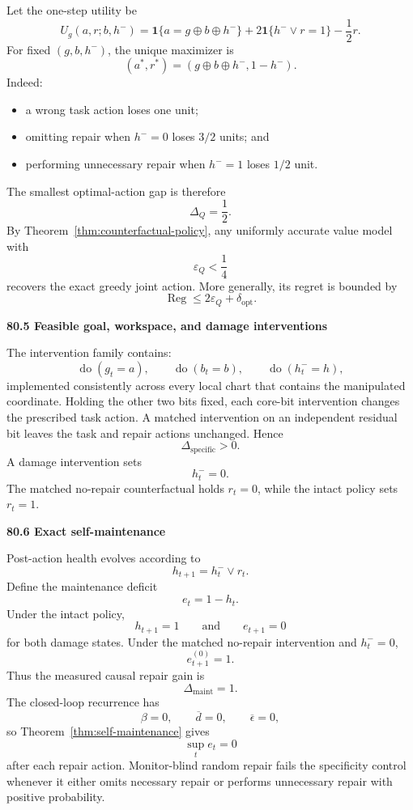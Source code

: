 \documentclass[11pt,letterpaper]{article}
\newcommand{\subtopic}[1]{%
 \vspace{0.45em}
 {\bfseries\color{AccentColor} #1\par}
}
\theoremstyle{plain}
\theoremstyle{definition}
\begin{document}
Let the one-step utility be
\[
U_g(a,r;b,h^-)
=
\mathbf 1\{a=g\oplus b\oplus h^-\}
+2\mathbf 1\{h^-\lor r=1\}
-\frac12r.
\]
For fixed \((g,b,h^-)\), the unique maximizer is
\[
\boxed{
(a^*,r^*)
=
(g\oplus b\oplus h^-,1-h^-).
}
\]
Indeed:
\begin{itemize}
\item a wrong task action loses one unit;
\item omitting repair when \(h^-=0\) loses \(3/2\) units; and
\item performing unnecessary repair when \(h^-=1\) loses \(1/2\) unit.
\end{itemize}
The smallest optimal-action gap is therefore
\[
\Delta_Q=\frac12.
\]
By Theorem~\ref{thm:counterfactual-policy}, any uniformly accurate value model with
\[
\varepsilon_Q<\frac14
\]
recovers the exact greedy joint action. More generally, its regret is bounded
by
\[
\operatorname{Reg}\leq2\varepsilon_Q+\delta_{\mathrm{opt}}.
\]

\subtopic{80.5 Feasible goal, workspace, and damage interventions}

The intervention family contains:
\[
\operatorname{do}(g_t=a),
\qquad
\operatorname{do}(b_t=b),
\qquad
\operatorname{do}(h_t^-=h),
\]
implemented consistently across every local chart that contains the manipulated
coordinate. Holding the other two bits fixed, each core-bit intervention
changes the prescribed task action. A matched intervention on an independent
residual bit leaves the task and repair actions unchanged. Hence
\[
\Delta_{\mathrm{specific}}>0.
\]
A damage intervention sets
\[
h_t^-=0.
\]
The matched no-repair counterfactual holds \(r_t=0\), while the intact policy
sets \(r_t=1\).

\subtopic{80.6 Exact self-maintenance}

Post-action health evolves according to
\[
h_{t+1}=h_t^-\lor r_t.
\]
Define the maintenance deficit
\[
e_t=1-h_t.
\]
Under the intact policy,
\[
h_{t+1}=1
\qquad\text{and}\qquad
e_{t+1}=0
\]
for both damage states. Under the matched no-repair intervention and
\(h_t^-=0\),
\[
e_{t+1}^{(0)}=1.
\]
Thus the measured causal repair gain is
\[
\boxed{
\Delta_{\mathrm{maint}}=1.
}
\]
The closed-loop recurrence has
\[
\beta=0,
\qquad
\overline d=0,
\qquad
\overline\epsilon=0,
\]
so Theorem~\ref{thm:self-maintenance} gives
\[
\sup_t e_t=0
\]
after each repair action. Monitor-blind random repair fails the specificity
control whenever it either omits necessary repair or performs unnecessary
repair with positive probability.
\end{document}
